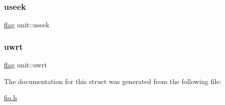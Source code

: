 \mbox{\label{structunit_a1dbff897975aa81144952d8415f2c872}} 
\subsubsection{\texorpdfstring{useek}{useek}}
{\footnotesize\ttfamily \hyperlink{dependencies_2third-party_2clapack_23_82_81_2_f2_c_l_i_b_s_2libf2c_2f2c_8h_abf5d144da384425ae6cb542ce6eec8d3}{flag} unit\+::useek}

\mbox{\label{structunit_a42e3a5611817ba6da3a2255c338bc97c}} 
\subsubsection{\texorpdfstring{uwrt}{uwrt}}
{\footnotesize\ttfamily \hyperlink{dependencies_2third-party_2clapack_23_82_81_2_f2_c_l_i_b_s_2libf2c_2f2c_8h_abf5d144da384425ae6cb542ce6eec8d3}{flag} unit\+::uwrt}



The documentation for this struct was generated from the following file\+:\begin{DoxyCompactItemize}
\item 
\hyperlink{fio_8h}{fio.\+h}\end{DoxyCompactItemize}
